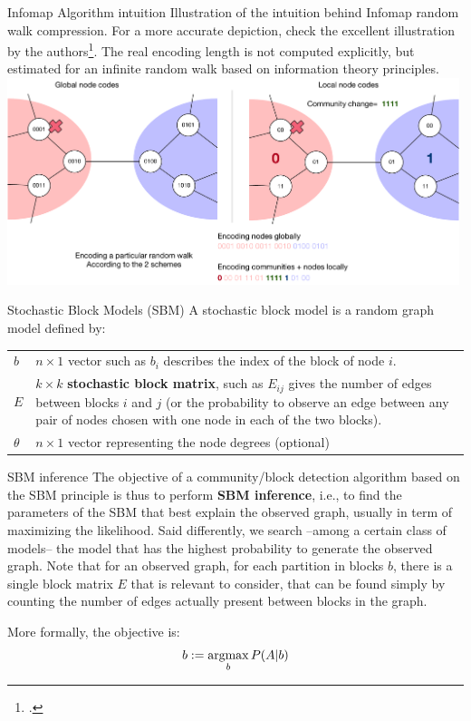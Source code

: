 \documentclass[a4paper,11pt]{book}
\begin{document}
\begin{textbox}{Infomap Algorithm intuition}
Illustration of the intuition behind Infomap random walk compression. For a more accurate depiction, check the excellent illustration by the authors\footcite{rosvall2008maps}. The real encoding length is not computed explicitly, but estimated for an infinite random walk based on information theory principles.
\centering
\includegraphics[width=0.99\textwidth]{pics/infomap.pdf}
\end{textbox}





\begin{textbox}{Stochastic Block Models (SBM)}
A stochastic block model is a random graph model defined by:
\begin{tabular}{p{}|p{}}\scriptsize

 $b$ & $n\times 1$ vector such as $b_i$ describes the index of the block of node $i$. \\
 $E$ & $k\times k$ \textbf{stochastic block matrix}, such as $E_{ij}$ gives the number of edges between blocks $i$ and $j$ (or the probability to observe an edge between any pair of nodes chosen with one node in each of the two blocks).\\
 $\theta$ & $n\times 1$ vector representing the node degrees (optional)
\end{tabular}
\end{textbox}

\begin{textbox}{SBM inference}
The objective of a community/block detection algorithm based on the SBM principle is thus to perform \textbf{SBM inference}, i.e., to find the parameters of the SBM that best explain the observed graph, usually in term of maximizing the likelihood. Said differently, we search --among a certain class of models-- the model that has the highest probability to generate the observed graph. Note that for an observed graph, for each partition in blocks $b$, there is a single block matrix $E$ that is relevant to consider, that can be found simply by counting the number of edges actually present between blocks in the graph.  

More formally, the objective is:
\[
b:=\operatorname*{argmax}_{b} P(A|b)
\]

\end{textbox}
\end{document}
